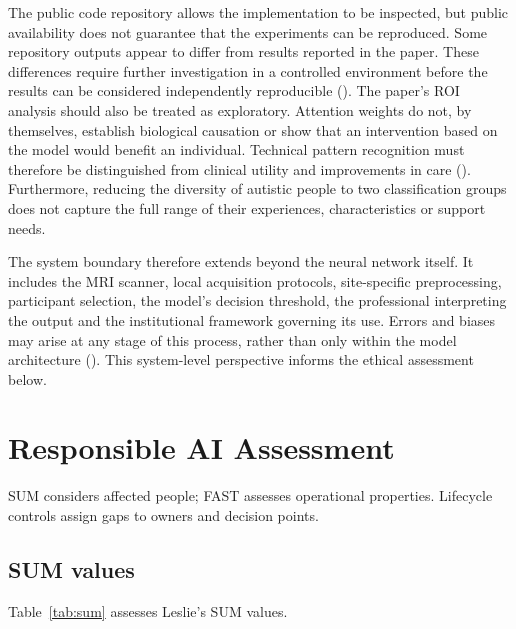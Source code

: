 \documentclass[11pt,a4paper]{article}
\begin{document}
The public code repository allows the implementation to be inspected, but public availability does not guarantee that the experiments can be reproduced. Some repository outputs appear to differ from results reported in the paper. These differences require further investigation in a controlled environment before the results can be considered independently reproducible (\cite{brainwavenetcode}). The paper's ROI analysis should also be treated as exploratory. Attention weights do not, by themselves, establish biological causation or show that an intervention based on the model would benefit an individual. Technical pattern recognition must therefore be distinguished from clinical utility and improvements in care (\cite{topol2019,who2021}). Furthermore, reducing the diversity of autistic people to two classification groups does not capture the full range of their experiences, characteristics or support needs.

The system boundary therefore extends beyond the neural network itself. It includes the MRI scanner, local acquisition protocols, site-specific preprocessing, participant selection, the model's decision threshold, the professional interpreting the output and the institutional framework governing its use. Errors and biases may arise at any stage of this process, rather than only within the model architecture (\cite{suresh2021}). This system-level perspective informs the ethical assessment below.

\section{Responsible AI Assessment}
SUM considers affected people; FAST assesses operational properties. Lifecycle controls assign gaps to owners and decision points.

\subsection{SUM values}
Table~\ref{tab:sum} assesses Leslie's SUM values.
\end{document}
